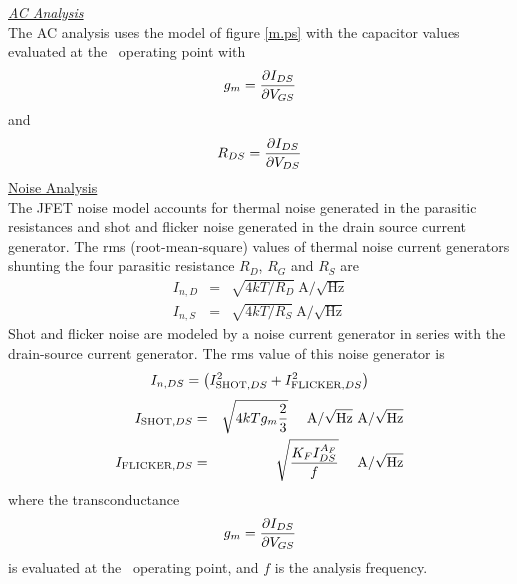 \noindent\underline{\sl \large AC Analysis}\\[0.1in]
The AC analysis uses the model of figure  \ref{m.ps} with the capacitor values
evaluated at the \dc\ operating point with
\begin{equation}
g_m = {{\textstyle\partial I_{DS}} \over {\textstyle\partial V_{GS}}}
\end{equation}
and
\begin{equation}
R_{DS} = {{\textstyle\partial I_{DS}} \over {\textstyle\partial V_{DS}}}
\end{equation}
\noindent\underline{\large Noise Analysis}\\[0.1in]
The JFET noise model accounts for thermal noise generated in the
parasitic resistances and shot and flicker noise generated in the
drain source current generator.  The rms (root-mean-square) values of
thermal noise current generators shunting the four parasitic resistance
$R_D$, $R_G$ and $R_S$ are
\begin{eqnarray}
I_{n,D} &=& \sqrt{4kT/R_D}~\mbox{A/}\sqrt{\mbox{Hz}}\\
I_{n,S} &=& \sqrt{4kT/R_S}~\mbox{A/}\sqrt{\mbox{Hz}}
\end{eqnarray}
Shot and flicker noise are modeled by
a noise current generator in series with the drain-source current generator.
The rms value of this noise generator is
\begin{equation}
I_{n,DS} = \left( I_{\mbox{\scriptsize SHOT},DS}^2 + I_{\mbox{\scriptsize FLICKER},DS}^2
                \right)
\end{equation}
\begin{eqnarray}
I_{\mbox{\scriptsize SHOT},DS} &=& \sqrt{4kTg_m\frac{2}{3}} ~~~~\mbox{A/}\sqrt{\mbox{Hz}}
~\mbox{A/}\sqrt{\mbox{Hz}}\\
I_{\mbox{\scriptsize FLICKER},DS} &=& \sqrt{{{\textstyle K_F I_{DS}^{A_F}} 
                         \over {\textstyle f }}}
~~~~\mbox{A/}\sqrt{\mbox{Hz}}
\end{eqnarray}
where the transconductance
\begin{equation}
g_m = {{\textstyle\partial I_{DS}} \over {\textstyle\partial V_{GS}}}
\end{equation}
is evaluated at the \dc\ operating point, and $f$ is the analysis frequency.
